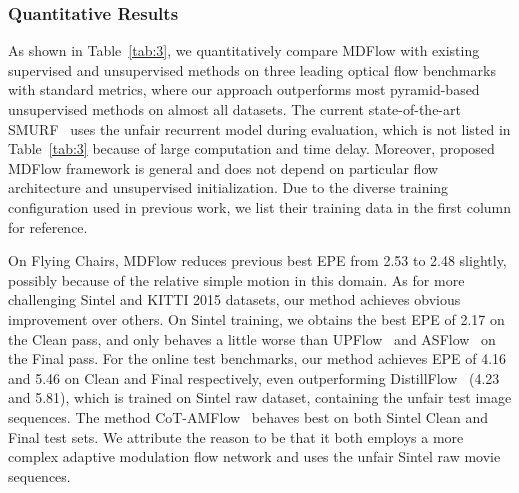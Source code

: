 \documentclass[lettersize,journal]{IEEEtran}
\begin{document}
\subsubsection{Quantitative Results}
As shown in Table~\ref{tab:3}, we quantitatively compare MDFlow with existing supervised and unsupervised methods on three leading optical flow benchmarks with standard metrics, where our approach outperforms most pyramid-based unsupervised methods on almost all datasets. The current state-of-the-art SMURF~\cite{Stone_2021_CVPR} uses the unfair recurrent model during evaluation, which is not listed in Table~\ref{tab:3} because of large computation and time delay. Moreover, proposed MDFlow framework is general and does not depend on particular flow architecture and unsupervised initialization. Due to the diverse training configuration used in previous work, we list their training data in the first column for reference.

On Flying Chairs, MDFlow reduces previous best EPE from 2.53 to 2.48 slightly, possibly because of the relative simple motion in this domain. As for more challenging Sintel and KITTI 2015 datasets, our method achieves obvious improvement over others. On Sintel training, we obtains the best EPE of 2.17 on the Clean pass, and only behaves a little worse than UPFlow~\cite{Luo_2021_CVPR} and ASFlow~\cite{9625946} on the Final pass. For the online test benchmarks, our method achieves EPE of 4.16 and 5.46 on Clean and Final respectively, even outperforming DistillFlow~\cite{9444870} (4.23 and 5.81), which is trained on Sintel raw dataset, containing the unfair test image sequences. The method CoT-AMFlow~\cite{Wang_CoRL_2020} behaves best on both Sintel Clean and Final test sets. We attribute the reason to be that it both employs a more complex adaptive modulation flow network and uses the unfair Sintel raw movie sequences.
\end{document}

